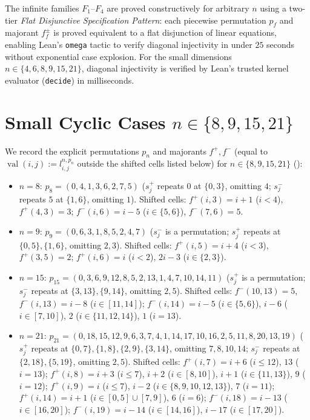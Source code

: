 \documentclass[10pt,a4paper]{article}
\theoremstyle{remark}
\newcommand{\val}{\operatorname{val}}
\begin{document}
The infinite families $F_1$--$F_4$ are proved constructively for arbitrary $n$ using a two-tier
\emph{Flat Disjunctive Specification Pattern}: each piecewise permutation $p_f$ and majorant $f^\pm_f$
is proved equivalent to a flat disjunction of linear equations, enabling Lean's \texttt{omega} tactic
to verify diagonal injectivity in under $25$ seconds without exponential case explosion.
For the small dimensions $n \in \{4, 6, 8, 9, 15, 21\}$, diagonal injectivity is verified by Lean's
trusted kernel evaluator (\texttt{decide}) in milliseconds.

\appendix

\section[Small Cyclic Cases]{Small Cyclic Cases $n \in \{8, 9, 15, 21\}$}\label{app:small}

We record the explicit permutations $p_n$ and majorants $f^+, f^-$ (equal to
$\val(i,j) := l^{n,p_n}_{i,j}$ outside the shifted cells listed below) for $n \in \{8, 9, 15, 21\}$
(\cite{PalomarLean,CompanionRepo}):
\begin{itemize}[nosep]\raggedright
  \item \emph{$n = 8$}: $p_8 = (0, 4, 1, 3, 6, 2, 7, 5)$ ($s^+_j$ repeats $0$ at $\{0,3\}$, omitting
  $4$; $s^-_j$ repeats $5$ at $\{1,6\}$, omitting $1$). Shifted cells: $f^+(i,3) = i + 1$ ($i < 4$),
  $f^+(4,3) = 3$; $f^-(i,6) = i - 5$ ($i \in \{5,6\}$), $f^-(7,6) = 5$.
  \item \emph{$n = 9$}: $p_9 = (0, 6, 3, 1, 8, 5, 2, 4, 7)$ ($s^-_j$ is a permutation; $s^+_j$ repeats
  at $\{0,5\}, \{1,6\}$, omitting $2, 3$). Shifted cells: $f^+(i,5) = i + 4$ ($i < 3$), $f^+(3,5) = 2$;
  $f^+(i,6) = i$ ($i < 2$), $2i - 3$ ($i \in \{2,3\}$).
  \item \emph{$n = 15$}: $p_{15} = (0, 3, 6, 9, 12, 8, 5, 2, 13, 1, 4, 7, 10, 14, 11)$ ($s^+_j$ is a
  permutation; $s^-_j$ repeats at $\{3,13\}, \{9,14\}$, omitting $2, 5$). Shifted cells:
  $f^-(10,13) = 5$, $f^-(i,13) = i - 8$ ($i \in [11,14]$); $f^-(i,14) = i - 5$ ($i \in \{5,6\}$),
  $i - 6$ ($i \in [7,10]$), $2$ ($i \in \{11,12,14\}$), $1$ ($i = 13$).
  \item \emph{$n = 21$}: $p_{21} = (0, 18, 15, 12, 9, 6, 3, 7, 4, 1, 14, 17, 10, 16, 2, 5, 11, 8, 20, 13, 19)$
  ($s^+_j$ repeats at $\{0,7\}, \{1,8\}, \{2,9\}, \{3,14\}$, omitting $7,8,10,14$; $s^-_j$ repeats at
  $\{2,18\}, \{5,19\}$, omitting $2,5$). Shifted cells: $f^+(i,7) = i + 6$ ($i \le 12$), $13$
  ($i = 13$); $f^+(i,8) = i + 3$ ($i \le 7$), $i + 2$ ($i \in [8,10]$), $i + 1$ ($i \in \{11,13\}$),
  $9$ ($i = 12$); $f^+(i,9) = i$ ($i \le 7$), $i - 2$ ($i \in \{8,9,10,12,13\}$), $7$ ($i = 11$);
  $f^+(i,14) = i + 1$ ($i \in [0,5] \cup [7,9]$), $6$ ($i = 6$); $f^-(i,18) = i - 13$ ($i \in [16,20]$);
  $f^-(i,19) = i - 14$ ($i \in [14,16]$), $i - 17$ ($i \in [17,20]$).
\end{itemize}
\end{document}
